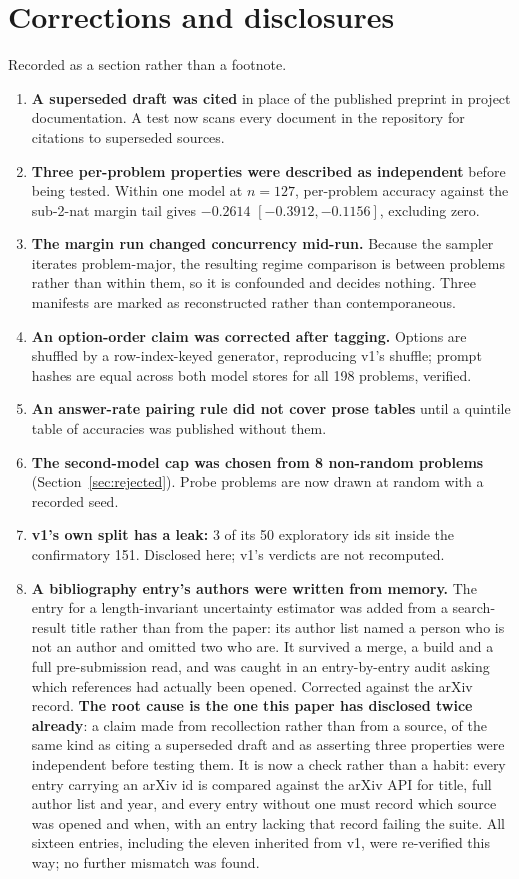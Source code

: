 \documentclass{article}
\begin{document}
\section{Corrections and disclosures}
\label{sec:corrections}

Recorded as a section rather than a footnote.

\begin{enumerate}
\item \textbf{A superseded draft was cited} in place of the published preprint
in project documentation. A test now scans every document in the repository for
citations to superseded sources.
\item \textbf{Three per-problem properties were described as independent}
before being tested. Within one model at $n=127$, per-problem accuracy against
the sub-2-nat margin tail gives $-0.2614$ $[-0.3912, -0.1156]$, excluding zero.
\item \textbf{The margin run changed concurrency mid-run.} Because the sampler
iterates problem-major, the resulting regime comparison is between problems
rather than within them, so it is confounded and decides nothing. Three
manifests are marked as reconstructed rather than contemporaneous.
\item \textbf{An option-order claim was corrected after tagging.} Options are
shuffled by a row-index-keyed generator, reproducing v1's shuffle; prompt
hashes are equal across both model stores for all 198 problems, verified.
\item \textbf{An answer-rate pairing rule did not cover prose tables} until a
quintile table of accuracies was published without them.
\item \textbf{The second-model cap was chosen from 8 non-random problems}
(Section~\ref{sec:rejected}). Probe problems are now drawn at random with a
recorded seed.
\item \textbf{v1's own split has a leak:} 3 of its 50 exploratory ids sit
inside the confirmatory 151. Disclosed here; v1's verdicts are not recomputed.
\item \textbf{A bibliography entry's authors were written from memory.} The
entry for a length-invariant uncertainty estimator was added from a
search-result title rather than from the paper: its author list named a person
who is not an author and omitted two who are. It survived a merge, a build and
a full pre-submission read, and was caught in an entry-by-entry audit asking
which references had actually been opened. Corrected against the arXiv record.
\textbf{The root cause is the one this paper has disclosed twice already}: a
claim made from recollection rather than from a source, of the same kind as
citing a superseded draft and as asserting three properties were independent
before testing them. It is now a check rather than a habit: every entry
carrying an arXiv id is compared against the arXiv API for title, full author
list and year, and every entry without one must record which source was opened
and when, with an entry lacking that record failing the suite. All sixteen
entries, including the eleven inherited from v1, were re-verified this way; no
further mismatch was found.


\end{enumerate}
\end{document}

